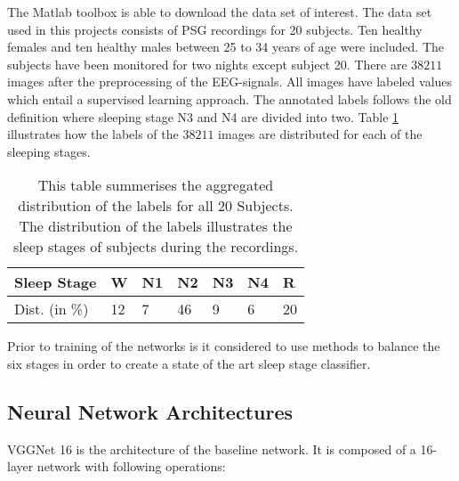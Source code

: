 The Matlab toolbox is able to download the data set of interest. The data set used in this projects consists of PSG recordings for 20 subjects. Ten healthy females and ten healthy males between 25 to 34 years of age were included. The subjects have been monitored for two nights except subject 20. There are $38211$ images after the preprocessing of the EEG-signals. All images have labeled values which entail a supervised learning approach. The annotated labels follows the old definition where sleeping stage N3 and N4 are divided into two. Table \ref{tab_class_balance} illustrates how the labels of the $38211$ images are distributed for each of the sleeping stages.

\begin{table}[th!]
\begin{tabular}{l|llllll}
Sleep Stage & W & N1 &  N2& N3 & N4 & R \\\hline
Dist. (in \%) &12 &7&46&9&6&20
\end{tabular}
\caption{This table summerises the aggregated distribution of the labels for all 20 Subjects. The distribution of the labels illustrates the sleep stages of subjects during the recordings.}
\label{tab_class_balance}
\end{table}

Prior to training of the networks is it considered to use methods to balance the six stages in order to create a state of the art sleep stage classifier.



\subsection{Neural Network Architectures}
VGGNet 16 \cite{main_ar, VGGnet16} is the architecture of the baseline network. It is composed of a 16-layer network with following operations:

